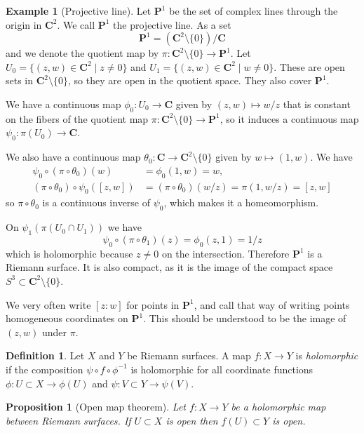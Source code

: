 \documentclass[11pt]{article}
\newtheorem{prop}[theo]{Proposition}
\theoremstyle{definition}
\newtheorem{defi}[theo]{Definition}
\newtheorem{exam}[theo]{Example}
\def\CC{\mathbf{C}}
\def\PP{\mathbf{P}}
\begin{document}
\begin{exam}[Projective line]
Let $\PP^1$ be the set of complex lines through the origin in $\CC^2$.
We call $\PP^1$ the projective line.
As a set
$$
\PP^1 
= (\CC^2 \setminus \{0\}) / \CC
$$
and we denote the quotient map by $\pi : \CC^2 \setminus \{0\} \to \PP^1$.
Let $U_0 = \{(z,w) \in \CC^2 \mid z\not=0\}$ and
$U_1 = \{(z,w) \in \CC^2 \mid w\not=0\}$.
These are open sets in $\CC^2\setminus\{0\}$, so they are open in the quotient
space.
They also cover $\PP^1$.

We have a continuous map $\phi_0 : U_0 \to \CC$ given by $(z,w) \mapsto w/z$
that is constant on the fibers of the quotient map $\pi : \CC^2\setminus\{0\}
\to \PP^1$, so it induces a continuous map $\psi_0 : \pi(U_0) \to \CC$.

We also have a continuous map $\theta_0 : \CC \to \CC^2\setminus\{0\}$ given by
$w \mapsto (1, w)$. 
We have 
\begin{align*}
\psi_0 \circ (\pi \circ \theta_0)(w) 
&= \phi_0(1, w)
= w,
\\
(\pi \circ \theta_0) \circ \psi_0([z,w]) 
&= (\pi \circ \theta_0)(w/z) = \pi(1, w/z) = [z,w]
\end{align*}
so $\pi \circ \theta_0$ is a continuous inverse of $\psi_0$, which makes it a
homeomorphism.

On $\psi_1(\pi(U_0 \cap U_1))$ we have
$$
\psi_0 \circ (\pi \circ \theta_1)(z)
= \phi_0 (z, 1)
= 1/z
$$
which is holomorphic because $z \not= 0$ on the intersection.
Therefore $\PP^1$ is a Riemann surface.
It is also compact, as it is the image of the compact space $S^3 \subset \CC^2
\setminus \{0\}$.

We very often write $[z:w]$ for points in $\PP^1$, and call that way of writing
points homogeneous coordinates on $\PP^1$. This should be understood to be the
image of $(z,w)$ under $\pi$.
\end{exam}



\begin{defi}
Let $X$ and $Y$ be Riemann surfaces.
A map $f : X \to Y$ is \emph{holomorphic} if the composition
$\psi \circ f \circ \phi^{-1}$ is holomorphic for all coordinate functions
$\phi : U \subset X \to \phi(U)$ and $\psi : V \subset Y \to \psi(V)$.
\end{defi}

\begin{prop}[Open map theorem]
Let $f : X \to Y$ be a holomorphic map between Riemann surfaces.
If $U \subset X$ is open then $f(U) \subset Y$ is open.
\end{prop}
\end{document}
